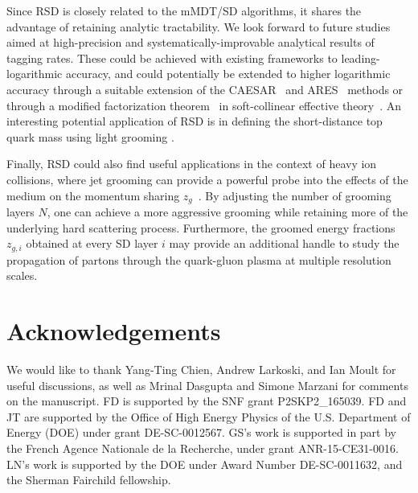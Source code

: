 \documentclass[11pt,a4paper]{article}
\begin{document}
Since RSD is closely related to the mMDT/SD algorithms, it shares the advantage of retaining analytic tractability.
%
We look forward to future studies aimed at high-precision and systematically-improvable analytical results of tagging rates.
%
These could be achieved with existing frameworks to
leading-logarithmic accuracy, and could potentially be extended to
higher logarithmic accuracy through a suitable extension of the
CAESAR~\cite{Banfi:2004yd} and ARES~\cite{Banfi:2014sua,Banfi:2016zlc}
methods or through a modified factorization theorem~\cite{Frye:2016okc} in
soft-collinear effective theory~\cite{Bauer:2000yr,Bauer:2001ct,Bauer:2001yt,Bauer:2002nz}.
%
An interesting potential application of RSD is in defining the short-distance top quark mass using light grooming \cite{Hoang:2017kmk}. 

Finally, RSD could also find useful applications in the context of heavy ion collisions, where jet grooming can provide a powerful probe
into the effects of the medium on the momentum sharing $z_g$~\cite{Sirunyan:2017bsd,Chien:2016led,Mehtar-Tani:2016aco,Milhano:2017nzm}.
%
By adjusting the number of grooming layers $N$, one can achieve a more aggressive grooming while retaining more of the underlying hard scattering process.
%
Furthermore, the groomed energy fractions $z_{g,i}$ obtained at every SD layer $i$ may provide an additional handle to study the propagation of
partons through the quark-gluon plasma at multiple resolution scales.


\section*{Acknowledgements}
We would like to thank Yang-Ting Chien, Andrew Larkoski, and Ian Moult
for useful discussions, as well as Mrinal Dasgupta and Simone Marzani
for comments on the manuscript.
%
FD is supported by the SNF grant P2SKP2\_165039.
%
FD and JT are supported by the Office of High Energy Physics of the U.S. Department of Energy (DOE) under grant DE-SC-0012567.
%
GS's work is supported in part by the French Agence Nationale de la
Recherche, under grant ANR-15-CE31-0016.
%
LN's work is supported by the DOE under Award Number DE-SC-0011632, and the Sherman Fairchild  fellowship.


\end{document}
